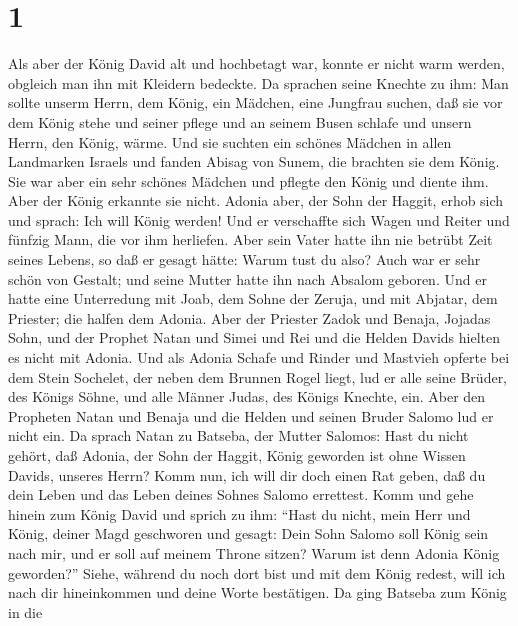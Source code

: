 \hypertarget{section}{%
\section{1}\label{section}}

 Als aber der König David alt und hochbetagt war, konnte
er nicht warm werden, obgleich man ihn mit Kleidern bedeckte.
 Da sprachen seine Knechte zu ihm: Man sollte unserm
Herrn, dem König, ein Mädchen, eine Jungfrau suchen, daß sie vor dem
König stehe und seiner pflege und an seinem Busen schlafe und unsern
Herrn, den König, wärme.  Und sie suchten ein schönes
Mädchen in allen Landmarken Israels und fanden Abisag von Sunem, die
brachten sie dem König.  Sie war aber ein sehr schönes
Mädchen und pflegte den König und diente ihm. Aber der König erkannte
sie nicht.  Adonia aber, der Sohn der Haggit, erhob sich
und sprach: Ich will König werden! Und er verschaffte sich Wagen und
Reiter und fünfzig Mann, die vor ihm herliefen.  Aber sein
Vater hatte ihn nie betrübt Zeit seines Lebens, so daß er gesagt hätte:
Warum tust du also? Auch war er sehr schön von Gestalt; und seine Mutter
hatte ihn nach Absalom geboren.  Und er hatte eine
Unterredung mit Joab, dem Sohne der Zeruja, und mit Abjatar, dem
Priester; die halfen dem Adonia.  Aber der Priester Zadok
und Benaja, Jojadas Sohn, und der Prophet Natan und Simei und Rei und
die Helden Davids hielten es nicht mit Adonia.  Und als
Adonia Schafe und Rinder und Mastvieh opferte bei dem Stein Sochelet,
der neben dem Brunnen Rogel liegt, lud er alle seine Brüder, des Königs
Söhne, und alle Männer Judas, des Königs Knechte, ein. 
Aber den Propheten Natan und Benaja und die Helden und seinen Bruder
Salomo lud er nicht ein.  Da sprach Natan zu Batseba, der
Mutter Salomos: Hast du nicht gehört, daß Adonia, der Sohn der Haggit,
König geworden ist ohne Wissen Davids, unseres Herrn? 
Komm nun, ich will dir doch einen Rat geben, daß du dein Leben und das
Leben deines Sohnes Salomo errettest.  Komm und gehe
hinein zum König David und sprich zu ihm: ``Hast du nicht, mein Herr und
König, deiner Magd geschworen und gesagt: Dein Sohn Salomo soll König
sein nach mir, und er soll auf meinem Throne sitzen? Warum ist denn
Adonia König geworden?''  Siehe, während du noch dort
bist und mit dem König redest, will ich nach dir hineinkommen und deine
Worte bestätigen.  Da ging Batseba zum König in die

